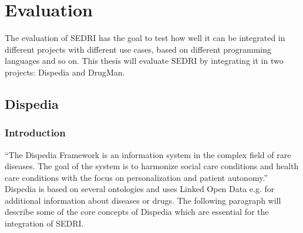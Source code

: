 
\chapter{Evaluation}
\label{cha:evaluation}

The evaluation of SEDRI has the goal to test how well it can be integrated in different projects with different use cases, based on different programming languages and so on.
This thesis will evaluate SEDRI by integrating it in two projects: Dispedia and DrugMan.

\section{Dispedia}
\label{sec:dispedia}

\subsection{Introduction}
\label{sec:introduction}

``The Dispedia Framework is an information system in the complex field of rare diseases. The goal of the system is to harmonize social care conditions and health care conditions with the focus on personalization and patient autonomy.'' \cite{elze2013dispedia}\\
Dispedia is based on several ontologies and uses Linked Open Data e.g. for additional information about diseases or drugs.
The following paragraph will describe some of the core concepts of Dispedia which are essential for the integration of SEDRI.

